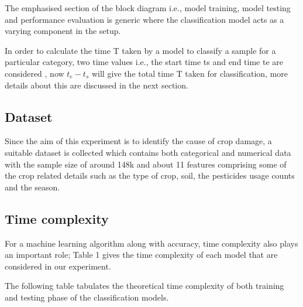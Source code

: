 \documentclass[12pt]{article}
\begin{document}
	The emphasised section of the block diagram i.e., model training, model testing and performance evaluation is generic where the classification model acts as a varying component in the setup.
	
	In order to calculate the time T taken by a model to classify a sample for a particular category, two time values i.e., the start time ts and end time te are considered , now $t_e - t_s$   will give the total time T taken for classification, more details about this are discussed in the next section.

\subsection{Dataset}
	Since the aim of this experiment is to identify the cause of crop damage, a suitable dataset is collected which contains both categorical and numerical data with the sample size of around 148k and about 11 features comprising some of the crop related details such as the type of crop, soil, the pesticides usage counts and the season.

\subsection{Time complexity}
For a machine learning algorithm along with accuracy, time complexity also plays an important role; Table 1 gives the time complexity of each model that are considered in our experiment.

The following table tabulates the theoretical time complexity of both training and testing phase of the classification models.
\end{document}
